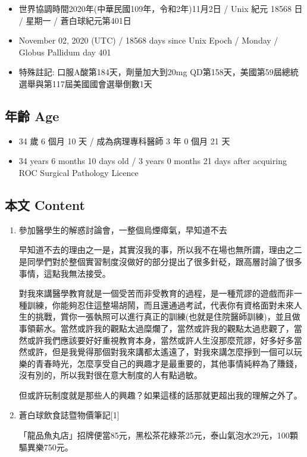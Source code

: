 \documentclass[
]{article}
\providecommand{\tightlist}{%
  \setlength{\itemsep}{0pt}\setlength{\parskip}{0pt}}
\begin{document}
\begin{itemize}
\tightlist
\item
  世界協調時間2020年(中華民國109年，令和2年)11月2日 / Unix 紀元 18568 日
  / 星期一 / 蒼白球紀元第401日
\item
  November 02, 2020 (UTC) / 18568 days since Unix Epoch / Monday /
  Globus Pallidum day 401
\item
  特殊註記: 口服A酸第184天，劑量加大到20mg
  QD第158天，美國第59屆總統選舉與第117屆美國國會選舉倒數1天
\end{itemize}

\hypertarget{ux5e74ux9f61-age-59}{%
\subsection{年齡 Age}\label{ux5e74ux9f61-age-59}}

\begin{itemize}
\tightlist
\item
  34 歲 6 個月 10 天 / 成為病理專科醫師 3 年 0 個月 21 天
\item
  34 years 6 months 10 days old / 3 years 0 months 21 days after
  acquiring ROC Surgical Pathology Licence
\end{itemize}

\hypertarget{ux672cux6587-content-59}{%
\subsection{本文 Content}\label{ux672cux6587-content-59}}

\begin{enumerate}
\def\labelenumi{\arabic{enumi}.}
\item
  參加醫學生的解惑討論會，一整個烏煙瘴氣，早知道不去

  早知道不去的理由之一是，其實沒我的事，所以我不在場也無所謂，理由之二是同學們對於整個實習制度沒做好的部分提出了很多針砭，跟高層討論了很多事情，這點我無法接受。

  對我來講醫學教育就是一個受苦而非受教育的過程，是一種荒謬的遊戲而非一種訓練，你能夠忍住這整場胡鬧，而且還通過考試，代表你有資格面對未來人生的挑戰，賞你一張執照可以進行真正的訓練(也就是住院醫師訓練)，並且做事領薪水。當然或許我的觀點太過糜爛了，當然或許我的觀點太過悲觀了，當然或許我們應該要好好重視教育本身，當然或許人生沒那麼荒謬，好多好多當然或許，但是我覺得那個對我來講都太遙遠了，對我來講怎麼掙到一個可以玩樂的青春時光，怎麼享受自己的興趣才是最重要的，其他事情純粹為了賺錢，沒有別的，所以我對很在意大制度的人有點過敏。

  但或許玩制度就是那些人的興趣？如果這樣的話那就更超出我的理解之外了。
\item
  蒼白球飲食誌暨物價筆記{[}1{]}

  「龍品魚丸店」招牌便當85元，黑松茶花綠茶25元，泰山氣泡水29元，100顆驅異樂750元。
\end{enumerate}
\end{document}

